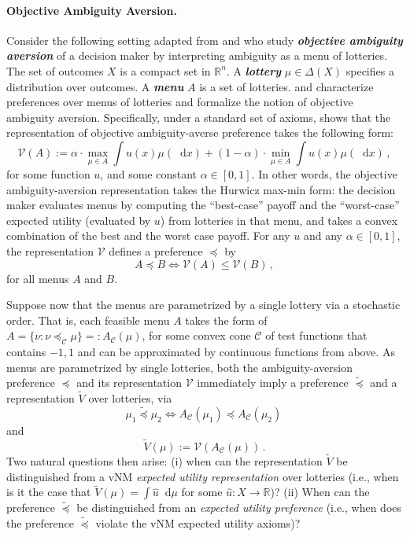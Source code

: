 \documentclass[12pt,letterpaper]{article}
\newenvironment{original}{\color{black}}{}
\theoremstyle{plain}
\theoremstyle{definition}
\theoremstyle{remark}
\newcommand{\C}{\mathcal{C}}
\newcommand{\R}{\mathds{R}}
\renewcommand*\d{\mathop{}\!\mathrm{d}}
\theoremstyle{definition}
\begin{document}
\paragraph{Objective Ambiguity Aversion.}\hspace{-2mm}
\begin{original}
Consider the following setting adapted from \citet{olszewski2007preferences} and \citet{Ahn2008AmbiguityWithoutStateSpace} who study \textit{\textbf{objective ambiguity aversion}} of a decision maker by interpreting ambiguity as a menu of lotteries. The set of outcomes $X$ is a compact set in $\R^n$. A \textit{\textbf{lottery}} $\mu \in \Delta(X)$ specifies a distribution over outcomes. A \textit{\textbf{menu}} $A$ is a set of lotteries. \citet{olszewski2007preferences} and \citet{Ahn2008AmbiguityWithoutStateSpace} characterize preferences over menus of lotteries and formalize the notion of objective ambiguity aversion. Specifically, under a standard set of axioms, \citet{olszewski2007preferences}  shows that the representation of objective ambiguity-averse preference takes the following form:
\[
\mathcal{V}(A) := \alpha \cdot \max_{\mu \in A} \int u(x) \mu(\d x) + (1 - \alpha) \cdot \min_{\mu \in A} \int u(x) \mu(\d x)\,,
\]
for some function $u$, and some constant $\alpha \in [0, 1]$. In other words, the objective ambiguity-aversion representation takes the Hurwicz max-min form: the decision maker evaluates menus by computing the ``best-case'' payoff and the ``worst-case'' expected utility (evaluated by $u$) from lotteries in that menu, and takes a convex combination of the best and the worst case payoff. For any $u$ and any $\alpha \in [0,1]$, the representation $\mathcal{V}$ defines a preference $\preceq$ by
\[
A \preceq  B \iff \mathcal{V}(A) \leq \mathcal{V}(B)\,,
\]
for all menus $A$ and $B$.

Suppose now that the menus are parametrized by a single lottery via a stochastic order. That is, each feasible menu $A$ takes the form of $A=\{\nu: \nu \preceq_\C \mu\}=:A_\C(\mu)$, for some convex cone $\C$ of test functions that contains $-1,1$ and can be approximated by continuous functions from above. As menus are parametrized by single lotteries, both the ambiguity-aversion preference $\preceq $ and its representation $\mathcal{V}$ immediately imply a preference $\widetilde{\preceq} $ and a representation $\widetilde{V}$ over lotteries, via
\[
\mu_1 \widetilde{\preceq} \mu_2 \iff A_\C(\mu_1) \preceq A_\C(\mu_2)\,
\]
and
\[
\widetilde{V}(\mu):=\mathcal{V}(A_\C(\mu))\,.
\]
Two natural questions then arise: (i) when can the representation $\widetilde{V}$ be distinguished from a vNM \textit{expected utility representation} over lotteries (i.e., when is it the case that $\widetilde{V}(\mu)=\int \hat{u} \d \mu$ for some $\hat{u}:X \to \R$)? (ii) When can the preference $\widetilde{\preceq} $ be distinguished from an \textit{expected utility preference} (i.e., when does the preference $\widetilde{\preceq}$ violate the vNM expected utility axioms)?


\end{original}
\end{document}
